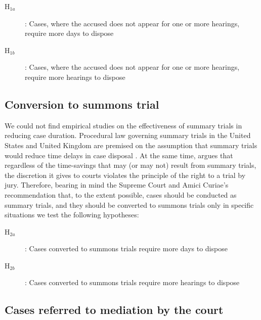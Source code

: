 \begin{description}
\item[H$_{1a}$]: Cases, where the accused does not appear for one or more hearings, require more days to dispose
\item[H$_{1b}$]: Cases, where the accused does not appear for one or more hearings, require more hearings to dispose
\end{description}

\subsection{Conversion to summons trial}
\label{sec:conv-summ-trial}

We could not find empirical studies on the effectiveness of summary trials in reducing case duration. Procedural law governing summary trials in the United States and United Kingdom are premised on the assumption that summary trials would reduce time delays in case disposal \autocite{miller2003}. At the same time, \textcite{miller2003} argues that regardless of the time-savings that may (or may not) result from summary trials, the discretion it gives to courts violates the principle of the right to a trial by jury. Therefore, bearing in mind the Supreme Court and Amici Curiae's recommendation that, to the extent possible, cases should be conducted as summary trials, and they should be converted to summons trials only in specific situations we test the following hypotheses:

\begin{description}
\item[H$_{2a}$]: Cases converted to summons trials require more days to dispose
\item[H$_{2b}$]: Cases converted to summons trials require more hearings to dispose
\end{description}

\subsection{Cases referred to mediation by the court} \label{sec:furth-exam-cases}

